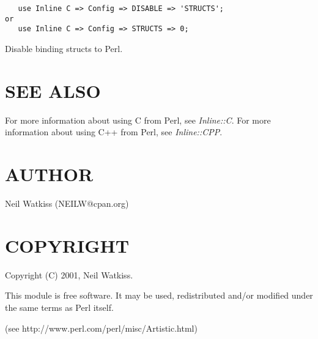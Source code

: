 \documentclass{article}
\begin{document}
\begin{verbatim}
   use Inline C => Config => DISABLE => 'STRUCTS';
or
   use Inline C => Config => STRUCTS => 0;
\end{verbatim}


Disable binding structs to Perl.

\section{SEE ALSO\label{SEE_ALSO}}


For more information about using C from Perl, see \emph{Inline::C}. For more
information about using C++ from Perl, see \emph{Inline::CPP}.

\section{AUTHOR\label{AUTHOR}}


Neil Watkiss (NEILW@cpan.org)

\section{COPYRIGHT\label{COPYRIGHT}}


Copyright (C) 2001, Neil Watkiss.



This module is free software. It may be used, redistributed and/or modified
under the same terms as Perl itself.



(see http://www.perl.com/perl/misc/Artistic.html)

\printindex
\end{document}
